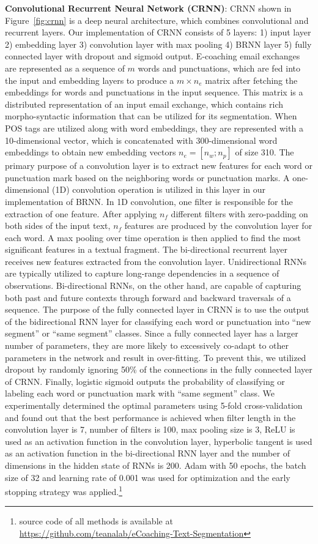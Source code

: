 \documentclass{amia}
\begin{document}
\textbf{Convolutional Recurrent Neural Network (CRNN)}: CRNN \cite{treviso2017sentence} shown in Figure~\ref{fig:crnn} is a deep neural architecture, which combines convolutional and recurrent layers. Our implementation of CRNN consists of 5 layers: 1) input layer 2) embedding layer 3) convolution layer with max pooling 4) BRNN layer 5) fully connected layer with dropout and sigmoid output. E-coaching email exchanges are represented as a sequence of $m$ words and punctuations, which are fed into the input and embedding layers to produce a $m \times n_e$ matrix after fetching the embeddings for words and punctuations in the input sequence. This matrix is a distributed representation of an input email exchange, which contains rich morpho-syntactic information that can be utilized for its segmentation. When POS tags are utilized along with word embeddings, they are represented with a 10-dimensional vector, which is concatenated with 300-dimensional word embeddings to obtain new embedding vectors $n_e = [n_w;n_p]$ of size 310. The primary purpose of a convolution layer is to extract new features for each word or punctuation mark based on the neighboring words or punctuation marks. A one-dimensional (1D) convolution operation is utilized in this layer in our implementation of BRNN. In 1D convolution, one filter is responsible for the extraction of one feature. After applying $n_f$ different filters with zero-padding on both sides of the input text, $n_f$ features are produced by the convolution layer for each word. A max pooling over time operation is then applied to find the most significant features in a textual fragment. The bi-directional recurrent layer receives new features extracted from the convolution layer. Unidirectional RNNs are typically utilized to capture long-range dependencies in a sequence of observations. Bi-directional RNNs, on the other hand, are capable of capturing both past and future contexts through forward and backward traversals of a sequence. The purpose of the fully connected layer in CRNN is to use the output of the bidirectional RNN layer for classifying each word or punctuation into ``new segment'' or ``same segment'' classes. Since a fully connected layer has a larger number of parameters, they are more likely to excessively co-adapt to other parameters in the network and result in over-fitting. To prevent this, we utilized dropout by randomly ignoring 50\% of the connections in the fully connected layer of CRNN. Finally, logistic sigmoid outputs the probability of classifying or labeling each word or punctuation mark with ``same segment'' class. We experimentally determined the optimal parameters using 5-fold cross-validation and found out that the best performance is achieved when filter length in the convolution layer is 7, number of filters is 100, max pooling size is 3, ReLU is used as an activation function in the convolution layer, hyperbolic tangent is used as an activation function in the bi-directional RNN layer and the number of dimensions in the hidden state of RNNs is 200. Adam\cite{kingma2014adam} with 50 epochs, the batch size of 32 and learning rate of 0.001 was used for optimization and the early stopping strategy was applied.\footnote{source code of all methods is available at \url{https://github.com/teanalab/eCoaching-Text-Segmentation}}
\end{document}
